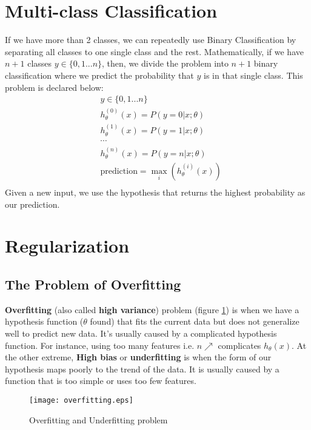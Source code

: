 \section{Multi-class Classification}
If we have more than 2 classes, we can repeatedly use Binary Classification by separating all classes to one single class and the rest. Mathematically, if we have $n + 1$ classes $y \in \lbrace0, 1 ... n\rbrace$, then, we divide the problem into $n+1$ binary classification where we predict the probability that $y$ is in that single class. This problem is declared below:
\begin{align*}
& y \in \lbrace0, 1 ... n\rbrace \\
& h_\theta^{(0)}(x) = P(y = 0 | x ; \theta) \\
& h_\theta^{(1)}(x) = P(y = 1 | x ; \theta) \\
& \cdots \\
& h_\theta^{(n)}(x) = P(y = n | x ; \theta) \\
& \mathrm{prediction} = \max_i( h_\theta ^{(i)}(x) )\\
\end{align*}
Given a new input, we use the hypothesis that returns the highest probability as our prediction.

\section{Regularization}
\subsection{The Problem of Overfitting}
\textbf{Overfitting} (also called \textbf{high variance}) problem (figure \ref{overfitting}) is when we have a hypothesis function ($\theta$ found) that fits the current data but does not generalize well to predict new data.  It's usually caused by a complicated hypothesis function. For instance, using too many features i.e. $n \nearrow$ complicates $h_\theta(x)$. At the other extreme, \textbf{High bias} or \textbf{underfitting} is when the form of our hypothesis maps poorly to the trend of the data. It is usually caused by a function that is too simple or uses too few features. 

\begin{figure}[!ht]
\centering
\texttt{[image: overfitting.eps]}
\caption{Overfitting and Underfitting problem}
\label{overfitting}
\end{figure}

